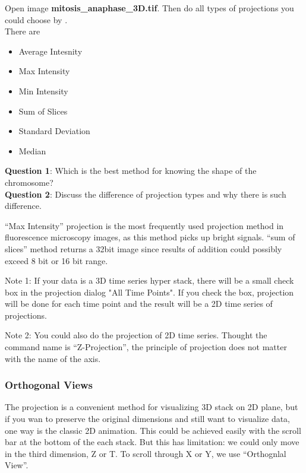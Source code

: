 \begin{indentexercise}{1}
Open image \textbf{mitosis\_anaphase\_3D.tif}.
Then do all types of projections you could choose by .\\
There are 
\begin{itemize}
\item Average Intesnity
\item Max Intensity
\item Min Intensity
\item Sum of Slices
\item Standard Deviation
\item Median
\end{itemize}

\textbf{Question 1}: Which is the best method for knowing the shape of the chromosome?\\
\textbf{Question 2}: Discuss the difference of projection types and why there is such difference.  
\end{indentexercise}

``Max Intensity'' projection is the most frequently used projection method in fluorescence microscopy images, as this method picks up bright signals. ``sum of slices'' method returns a 32bit image since results of addition could possibly exceed 8 bit or 16 bit range. 

Note 1: If your data is a 3D time series hyper stack, there will be a small check box in the projection dialog "All Time Points". If you check the box, projection will be done for each time point and the result will be a 2D time series of projections.

Note 2: You could also do the projection of 2D time series. Thought the command name is ``Z-Projection'', the principle of projection does not matter with the name of the axis.  

\subsubsection{Orthogonal Views}

The projection is a convenient method for visualizing 3D stack on 2D plane, but if you wan to preserve the original dimensions and still want to visualize data, one way is the classic 2D animation. This could be achieved easily with the scroll bar at the bottom of the each stack. But this has limitation: we could only move in the third dimension, Z or T. To scroll through X or Y, we use ``Orthognlal View''. 


